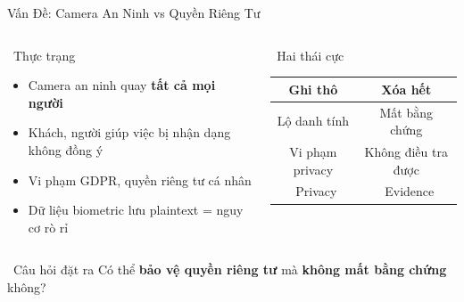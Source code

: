 \documentclass[aspectratio=169, 12pt]{beamer}
\newcommand{\xmark}{\textcolor{accent}{\ding{55}}}
\begin{document}
\begin{frame}{Vấn Đề: Camera An Ninh vs Quyền Riêng Tư}
\begin{columns}[T]
\begin{alertblock}{\faExclamationTriangle\ Thực trạng}
\begin{itemize}
  \item Camera an ninh quay \textbf{tất cả mọi người}
  \item Khách, người giúp việc bị nhận dạng không đồng ý
  \item Vi phạm GDPR, quyền riêng tư cá nhân
  \item Dữ liệu biometric lưu plaintext = nguy cơ rò rỉ
\end{itemize}
\end{alertblock}

\begin{alertblock}{\faExclamationTriangle\ Hai thái cực}
\smallskip
\begin{center}
\begin{tabular}{cc}
\textbf{Ghi thô} & \textbf{Xóa hết} \\
\hline
\textcolor{accent}{Lộ danh tính} & \textcolor{accent}{Mất bằng chứng} \\
Vi phạm privacy & Không điều tra được \\
\xmark\ Privacy & \xmark\ Evidence \\
\end{tabular}
\end{center}
\end{alertblock}
\end{columns}

\vspace{0.5em}
\begin{block}{\faLightbulb\ Câu hỏi đặt ra}
\centering\large
Có thể \textbf{bảo vệ quyền riêng tư} mà \textbf{không mất bằng chứng} không?
\end{block}
\end{frame}
\end{document}
